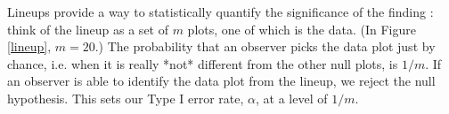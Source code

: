 


Lineups provide a way to statistically quantify the significance of the finding \cite{majumder:2011}: think of the lineup as a set of $m$ plots, one of which is the data. (In Figure \ref{lineup}, $m=20$.)  The probability that an observer picks the data plot just by chance, i.e. when it is really *not* different from the other null plots, is $1/m$.  If an observer is able to identify the data plot from the lineup, we reject the null hypothesis.  This sets our Type I error rate, $\alpha$, at a level of $1/m$.

